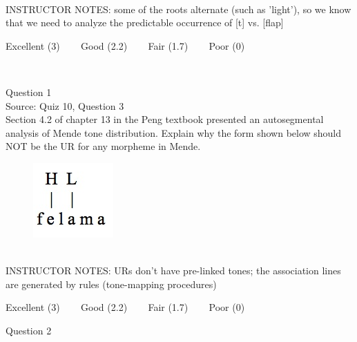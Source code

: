 \documentclass[12pt]{article}
\begin{document}
~\\
INSTRUCTOR NOTES: some of the roots alternate (such as 'light'), so we know that we need to analyze the predictable occurrence of [t] vs. [flap]


\vfill
Excellent (3) ~~~ Good (2.2) ~~~ Fair (1.7) ~~~ Poor (0)
\newpage

\begin{center}
\textbf{{\color{red}{\HUGE END OF EXAM}}}\\

\end{center}
\newpage

\begin{center}
\textbf{{\color{blue}{\HUGE START OF EXAM\\}}}

\textbf{{\color{blue}{\HUGE Student ID: 3129\\}}}

\textbf{{\color{blue}{\HUGE 10:30 - 10:50 AM\\}}}

\end{center}
\newpage

{\large Question 1}\\

Source: Quiz 10, Question 3\\

Section 4.2 of chapter 13 in the Peng textbook presented an autosegmental analysis of Mende tone distribution. Explain why the form shown below should NOT be the UR for any morpheme in Mende.\\

\begin{figure}[H]
\includegraphics{../images/mende_junction_a.png}
\end{figure}

~\\
INSTRUCTOR NOTES: URs don't have pre-linked tones; the association lines are generated by rules (tone-mapping procedures)


\vfill
Excellent (3) ~~~ Good (2.2) ~~~ Fair (1.7) ~~~ Poor (0)
\newpage

{\large Question 2}\\
\end{document}
